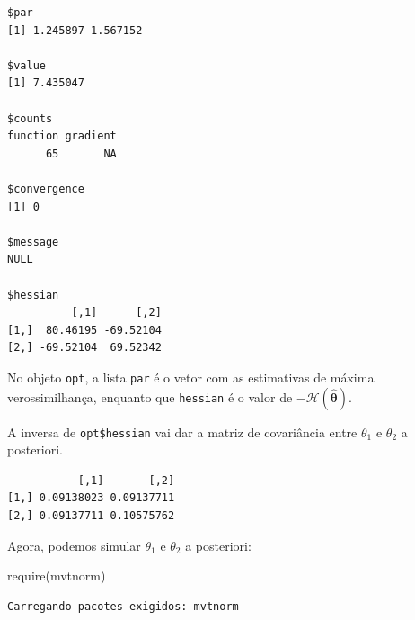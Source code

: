 \documentclass[
  letterpaper,
  DIV=11,
  numbers=noendperiod]{scrreprt}
\newenvironment{Shaded}{\begin{snugshade}}{\end{snugshade}}
\newcommand{\DecValTok}[1]{\textcolor[rgb]{0.68,0.00,0.00}{#1}}
\newcommand{\FunctionTok}[1]{\textcolor[rgb]{0.28,0.35,0.67}{#1}}
\newcommand{\NormalTok}[1]{\textcolor[rgb]{0.00,0.23,0.31}{#1}}
\newcommand{\OtherTok}[1]{\textcolor[rgb]{0.00,0.23,0.31}{#1}}
\newcommand{\SpecialCharTok}[1]{\textcolor[rgb]{0.37,0.37,0.37}{#1}}
\theoremstyle{definition}
\theoremstyle{definition}
\theoremstyle{remark}
\begin{document}
\begin{verbatim}
$par
[1] 1.245897 1.567152

$value
[1] 7.435047

$counts
function gradient 
      65       NA 

$convergence
[1] 0

$message
NULL

$hessian
          [,1]      [,2]
[1,]  80.46195 -69.52104
[2,] -69.52104  69.52342
\end{verbatim}

No objeto \texttt{opt}, a lista \texttt{par} é o vetor com as
estimativas de máxima verossimilhança, enquanto que \texttt{hessian} é o
valor de \(-\mathcal{H}(\hat{\boldsymbol{\theta}})\).

A inversa de \texttt{opt\$hessian} vai dar a matriz de covariância entre
\(\theta_1\) e \(\theta_2\) a posteriori.

\begin{Shaded}
\end{Shaded}

\begin{verbatim}
           [,1]       [,2]
[1,] 0.09138023 0.09137711
[2,] 0.09137711 0.10575762
\end{verbatim}

Agora, podemos simular \(\theta_1\) e \(\theta_2\) a posteriori:

\begin{Shaded}
\begin{Highlighting}[]
\FunctionTok{require}\NormalTok{(mvtnorm)}
\end{Highlighting}
\end{Shaded}

\begin{verbatim}
Carregando pacotes exigidos: mvtnorm
\end{verbatim}

\begin{Shaded}
\end{Shaded}
\end{document}
